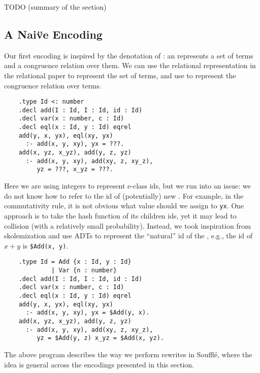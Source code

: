 TODO (summary of the section)

\subsection{A Nai\"ve Encoding}\label{sec:naive}

Our first encoding is inspired by the denotation of \egraphs:
 an \egraph represents a set of terms and a congruence relation over them.
We can use the relational representation in the relational \ematching paper
 to represent the set of terms, 
 and use \eqrel{} to represent the congruence relation over terms.
\begin{verbatim}
    .type Id <: number
    .decl add(I : Id, I : Id, id : Id)
    .decl var(x : number, c : Id)
    .decl eql(x : Id, y : Id) eqrel
    add(y, x, yx), eql(xy, yx) 
      :- add(x, y, xy), yx = ???.
    add(x, yz, x_yz), add(y, z, yz) 
      :- add(x, y, xy), add(xy, z, xy_z), 
         yz = ???, x_yz = ???.
\end{verbatim}
Here we are using integers to represent e-class ids, 
 but we run into an issue:
 we do not know how to refer to the \eclass id
 of (potentially) new \eclasses.
For example,
 in the commutativity rule,
 it is not obvious what value should we assign to \verb|yx|.
One approach is to take the hash function of its children \eclass ids,
 yet it may lead to collision (with a relatively small probability).
Instead, we took inspiration from skolemization and use ADTs 
 to represent the ``natural'' \eclass id of the \enode,
 e.g., the id of $x+y$ is \verb|$Add(x, y)|.
\begin{verbatim}
    .type Id = Add {x : Id, y : Id}
             | Var {n : number}
    .decl add(I : Id, I : Id, id : Id)
    .decl var(x : number, c : Id)
    .decl eql(x : Id, y : Id) eqrel
    add(y, x, yx), eql(xy, yx) 
      :- add(x, y, xy), yx = $Add(y, x).
    add(x, yz, x_yz), add(y, z, yz) 
      :- add(x, y, xy), add(xy, z, xy_z), 
         yz = $Add(y, z) x_yz = $Add(x, yz).
\end{verbatim}
The above program describes the way we perform rewrites in Souffl\'e,
 where the idea is general across the encodings presented in this section.

